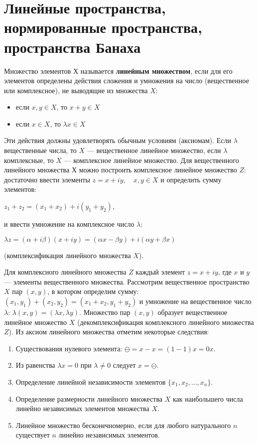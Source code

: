 \documentclass[12pt,a4paper,titlepage]{book}
\begin{document}
\section{Линейные пространства, нормированные пространства, пространства Банаха}

\par Множество элементов $Х$ называется \textbf{линейным множеством}, если для его элементов определены действия сложения и умножения на число (вещественное или комплексное), не выводящие из множества $X$:
\begin{itemize}
    \item если $x,y\in X$, то $x+y\in X$
    \item если $x\in X$, то $\lambda x\in X$
\end{itemize}
\par Эти действия должны удовлетворять обычным условиям (аксиомам). Если $\lambda$ вещественные числа, то $X$ --- вещественное линейное множество, если $\lambda$ комплексные, то $X$ --- комплексное линейное множество. Для вещественного линейного множества $Х$ можно построить комплексное линейное множество $Z$: достаточно ввести элементы $z=x+iy,\quad x,y \in X$ и определить сумму элементов:
\begin{center}
$z_1+z_2=(x_1+x_2)+i(y_1+y_2)$,
\end{center}
и ввести умножение на комплексное число $\lambda$:
\begin{center}
$\lambda z = (\alpha + i\beta)(x+iy) = (\alpha x - \beta y)+i(\alpha y + \beta x)$
\end{center}
(комплексификация линейного множества $X$).
\par Для комплексного линейного множества $Z$ каждый элемент $z=x+iy$, где $x$ и $y$ --- элементы вещественного множества. Рассмотрим вещественное пространство $X$ пар $(x,y)$, в котором определим сумму: $(x_1,y_1)+(x_2,y_2) = (x_1+x_2,y_1+y_2)$ и умножение на вещественное число $\lambda$: $\lambda(x,y) = (\lambda x, \lambda y)$. Множество пар $(x,y)$ образует вещественное линейное множество  $X$ (декомплексификация комплексного линейного множества $Z$).
Из аксиом линейного множества отметим некоторые следствия:
\begin{enumerate}
\item Существования нулевого элемента: $\ominus=x-x=(1-1)x=0x$.
\item Из равенства $\lambda x=0$ при $\lambda\ne0$ следует $x=\ominus$.
\item Определение линейной независимости элементов $\{x_1,x_2,\dotsc,x_n\}$.
\item Определение размерности линейного множества $X$ как наибольшего числа линейно независимых элементов множества $X$.
\item Линейное множество бесконечномерно, если для любого натурального $n$ существует $n$ линейно независимых элементов.
\end{enumerate}
\end{document}
